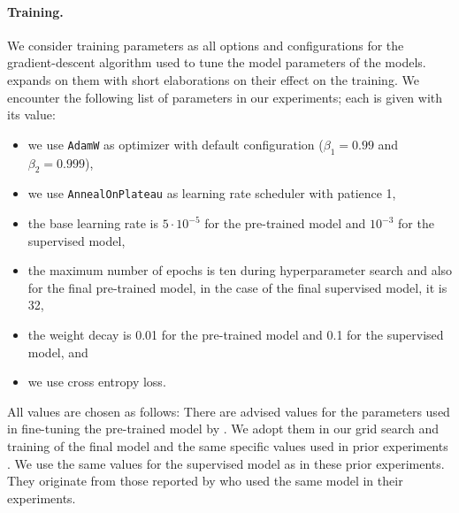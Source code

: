 \documentclass[../../document.tex]{subfiles}
\begin{document}
    \paragraph*{Training.}
    We consider training parameters as all options and configurations for the gradient-descent algorithm  used to tune the model parameters of the  models.
     expands on them with short elaborations on their effect on the training.
    We encounter the following list of parameters in our experiments; each is given with its value:
    \begin{itemize}
        \item we use \texttt{AdamW} as optimizer with default configuration ($\beta_1 = 0.99$ and $\beta_2 = 0.999$),
        \item we use \texttt{AnnealOnPlateau} as learning rate scheduler with patience 1,
        \item the base learning rate is $5\cdot 10^{-5}$ for the pre-trained model and $10^{-3}$ for the supervised model,
        \item the maximum number of epochs is ten during hyperparameter search and also for the final pre-trained model, in the case of the final supervised model, it is 32,
        \item the weight decay is 0.01 for the pre-trained model and 0.1 for the supervised model, and
        \item we use cross entropy loss.
    \end{itemize}
    All values are chosen as follows:
    There are advised values for the parameters used in fine-tuning the pre-trained model by \citet{Devlin2019}.
    We adopt them in our grid search and training of the final model and the same specific values used in prior experiments \citep[cf.\@][]{Rup22}.
    We use the same values for the supervised model as in these prior experiments.
    They originate from those reported by \citet{Cor20,StaSte20} who used the same model in their experiments.
\end{document}
